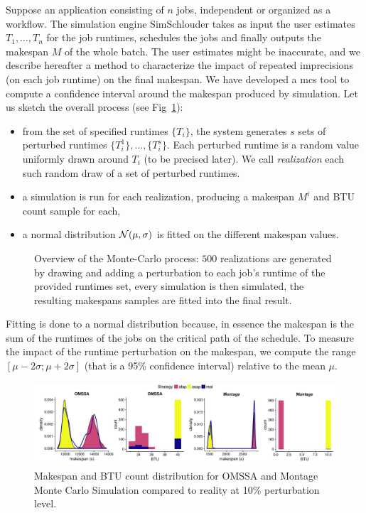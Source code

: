 \documentclass[10pt,conference,compsocconf]{IEEEtran}
\begin{document}
Suppose an  application consisting of  $n$ jobs,  independent or organized  as a
workflow.  The simulation engine SimSchlouder  takes as input the user estimates
$T_1, \ldots , T_n$ for the job runtimes, schedules the jobs and finally outputs
the makespan $M$ of the whole batch.  The user estimates might be inaccurate,
and  we describe  hereafter  a method  to characterize  the  impact of  repeated
imprecisions (on each  job runtime) on the final makespan.   We have developed a
\ac{mcs} tool to  compute a confidence interval around the  makespan produced by
simulation.  Let us sketch the overall process (see Fig~\ref{fig:mc-process}):
\begin{itemize} 
\item from  the set of  specified runtimes  $\{T_i\}$, the system  generates $s$
  sets  of perturbed  runtimes $\{T_i^1\},  \ldots, \{T_i^s\}$.   Each perturbed
  runtime  is a  random  value  uniformly drawn  around  $T_i$  (to be  precised
  later). We call \emph{realization} each such random draw of a set of perturbed
  runtimes.
\item a simulation  is run for each realization, producing  a makespan $M^i$ and
  BTU count sample for each,
\item a  normal distribution ${\cal  N}(\mu,\sigma)$ is fitted on  the different
  makespan values.
\end{itemize}
\begin{figure}
	\centering
	\resizebox{0.5\textwidth}{!}{%
		
		}
\caption{Overview of the Monte-Carlo process: $500$ realizations are generated
by drawing and adding a perturbation to each job's runtime of the provided
runtimes set, every simulation is then simulated, the resulting makespans
samples are fitted into the final result.}\label{fig:mc-process}
\end{figure}
Fitting is done to a normal distribution because, in essence the makespan is the
sum  of the  runtimes of  the jobs  on the  critical path  of the  schedule.  To
measure the impact  of the runtime perturbation on the  makespan, we compute the
range $[\mu-2\sigma;\mu+2\sigma]$ (that is  a 95\% confidence interval) relative
to  the mean  $\mu$. 

\begin{figure}
	\includegraphics[width=\textwidth]{gfx/fit_plot.pdf}
	\caption{Makespan and BTU count distribution for OMSSA and Montage Monte
	Carlo Simulation compared to reality at 10\% perturbation
	level.}\label{fig:fit}
\end{figure}
\end{document}
